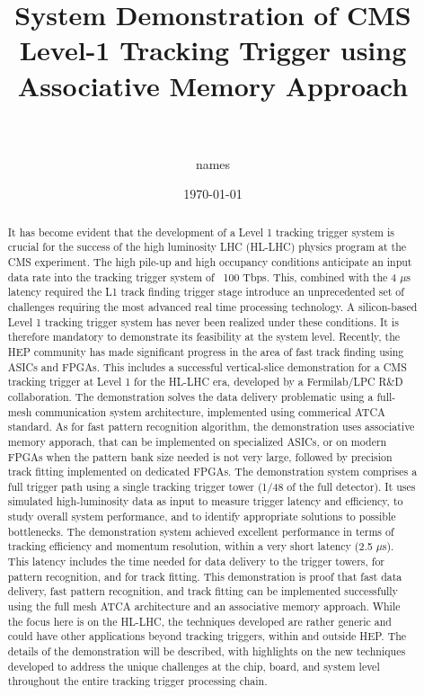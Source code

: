 \documentclass[10pt,a4paper]{article}
\title{\huge{  
System Demonstration of CMS Level-1 Tracking Trigger using Associative Memory Approach} \\
\ \  \\
\large{ }}
\author{names}
\date{\today}
\begin{document}
%




\maketitle

\begin{abstract}

It has become evident that the development of a Level 1 tracking trigger system is crucial for the success of the high luminosity LHC (HL-LHC) physics program at the CMS experiment. The high pile-up and high occupancy conditions anticipate an input data rate into the tracking trigger system of ~100 Tbps. This, combined with the 
4 $\mu$s latency required the L1 track finding trigger stage introduce an unprecedented set of challenges requiring the most advanced real time processing technology. A silicon-based Level 1 tracking trigger system has never been realized under these conditions. It is therefore mandatory to demonstrate its feasibility at the system level. Recently, the HEP community has made significant progress in the area of fast track finding using ASICs and FPGAs. This includes a successful vertical-slice demonstration for a CMS tracking trigger at Level 1 for the HL-LHC era, developed by a Fermilab/LPC R\&D collaboration. The demonstration solves the data delivery problematic using a full-mesh communication system architecture, implemented using commerical ATCA standard. As for fast pattern recognition algorithm, the demonstration uses associative memory apporach, that can be implemented on specialized ASICs, or on modern FPGAs when the pattern bank size needed is not very large, followed by precision track fitting implemented on dedicated FPGAs. The demonstration system comprises a full trigger path using a single tracking trigger tower (1/48 of the full detector). It uses simulated high-luminosity data as input to measure trigger latency and efficiency, to study overall system performance, and to identify appropriate solutions to possible bottlenecks.  The demonstration system achieved excellent performance in terms of tracking efficiency and momentum resolution, within a very short latency (2.5 $\mu$s). This latency includes the time needed for data delivery to the trigger towers, for pattern recognition, and for track fitting. This demonstration is proof that fast data delivery, fast pattern recognition, and track fitting can be implemented successfully using the full mesh ATCA architecture and an associative memory approach. While the focus here is on the HL-LHC, the techniques developed are rather generic and could have other applications beyond tracking triggers, within and outside HEP. The details of the demonstration will be described, with highlights on the new techniques developed to address the unique challenges at the chip, board, and system level throughout the entire tracking trigger processing chain.  


\end{abstract}
\end{document}
